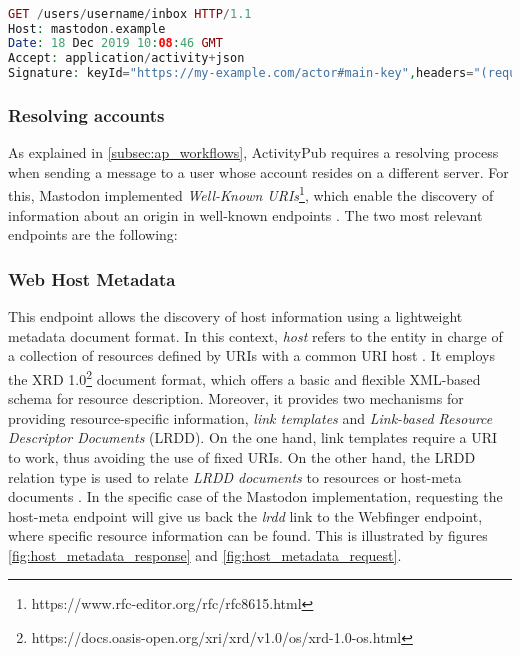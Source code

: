 \lstset{style=JSONStyle}
\begin{lstlisting}[language=PHP, caption=Signed HTTP Request, label=fig:http_signature, float=h]

GET /users/username/inbox HTTP/1.1
Host: mastodon.example
Date: 18 Dec 2019 10:08:46 GMT
Accept: application/activity+json
Signature: keyId="https://my-example.com/actor#main-key",headers="(request-target) host date",signature="Y2FiYW...IxNGRiZDk4ZA=="

\end{lstlisting}

\subsubsection*{\textbf{Resolving accounts}}
As explained in \ref{subsec:ap_workflows}, ActivityPub requires a resolving process when sending a message to a user whose account resides on a different server. For this, Mastodon implemented \emph{Well-Known URIs}\footnote{https://www.rfc-editor.org/rfc/rfc8615.html}, which enable the discovery of information about an origin in well-known endpoints \cite{nottingham_2019}. The two most relevant endpoints are the following: 

\subsubsection*{Web Host Metadata}
This endpoint allows the discovery of host information using a lightweight metadata document format. In this context, \emph{host} refers to the entity in charge of a collection of resources defined by URIs with a common URI host \cite{cook_2011}. It employs the XRD 1.0\footnote{https://docs.oasis-open.org/xri/xrd/v1.0/os/xrd-1.0-os.html} document format, which offers a basic and flexible XML-based schema for resource description. Moreover, it provides two mechanisms for providing resource-specific information, \emph{link templates} and \emph{Link-based Resource Descriptor Documents} (LRDD). On the one hand, link templates require a URI to work, thus avoiding the use of fixed URIs. On the other hand, the LRDD relation type is used to relate \emph{LRDD documents} to resources or host-meta documents \cite{cook_2011}. In the specific case of the Mastodon implementation, requesting the host-meta endpoint will give us back the \emph{lrdd} link to the Webfinger endpoint, where specific resource information can be found. This is illustrated by figures \ref{fig:host_metadata_response} and \ref{fig:host_metadata_request}.


